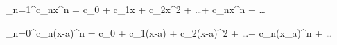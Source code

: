 \sum_{n=1}^\infty c_nx^n = c_0 + c_1x + c_2x^2 + \ldots + c_nx^n + \ldots

\sum_{n=0}^\infty c_n(x-a)^n = c_0 + c_1(x-a) + c_2(x-a)^2 + \ldots + c_n(x_a)^n + \ldots

